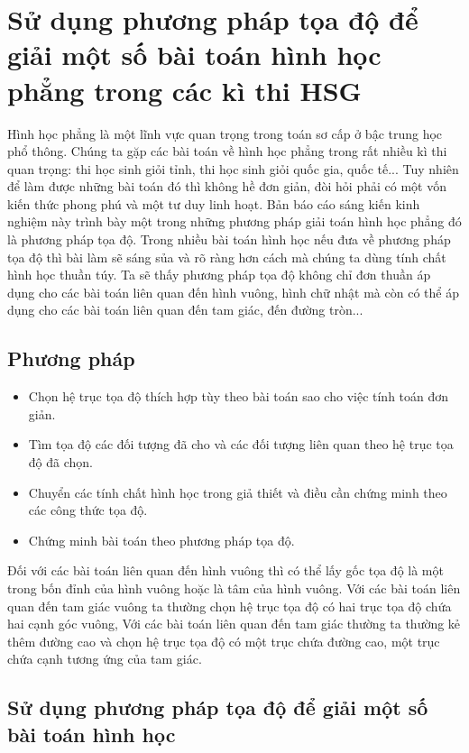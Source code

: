 	
\section{Sử dụng phương pháp tọa độ để giải một số bài toán hình học phẳng trong các kì thi HSG}
\begin{center}\textbf{\color{violet}{Trần Xuân Đáng - Trường THPT chuyên Lê Hồng Phong - Nam Định}}\end{center}
\noindent Hình học phẳng là một lĩnh vực quan trọng trong toán sơ cấp ở bậc trung học phổ thông. Chúng ta gặp các bài toán về hình học phẳng trong rất nhiều kì thi quan trọng: thi học sinh giỏi tỉnh, thi học sinh giỏi quốc gia, quốc tế... Tuy nhiên để làm được những bài toán đó thì không hề đơn giản, đòi hỏi phải có một vốn kiến thức phong phú và một tư duy linh hoạt. Bản báo cáo sáng kiến kinh nghiệm này trình bày một trong những phương pháp giải toán hình học phẳng đó là  phương pháp tọa độ. Trong nhiều bài toán hình học nếu đưa về phương pháp tọa độ thì bài làm sẽ sáng sủa và rõ ràng hơn cách mà chúng ta dùng tính chất hình học thuần túy. Ta sẽ thấy phương pháp tọa độ không chỉ đơn thuần áp dụng cho các bài toán liên quan đến hình vuông, hình chữ nhật mà còn có thể áp dụng cho các bài toán liên quan đến tam giác, đến đường tròn...
\subsection{Phương pháp}	
\begin{itemize}
	\item Chọn hệ trục tọa độ thích hợp tùy theo bài toán sao cho việc tính toán đơn giản.
	\item 	Tìm tọa độ các đối tượng đã cho và các đối tượng liên quan theo hệ trục tọa độ đã chọn.
	\item 	Chuyển các tính chất hình học trong giả thiết và điều cần chứng minh  theo các công thức tọa độ.
	\item 	Chứng minh bài toán theo phương pháp tọa độ.
\end{itemize}
\noindent 	Đối với các bài toán liên quan đến hình vuông thì có thể lấy gốc tọa độ là một trong bốn đỉnh của hình vuông hoặc là tâm của hình vuông. 
Với các bài toán liên quan đến tam giác vuông ta thường chọn hệ trục tọa độ có 
hai trục tọa độ chứa hai cạnh góc vuông,
Với các bài toán liên quan đến tam giác thường ta thường kẻ thêm đường cao
và chọn hệ trục tọa độ có một trục chứa đường cao, một trục chứa cạnh tương ứng của tam giác. 

\subsection{Sử dụng phương pháp tọa độ để giải một số bài toán hình học}



